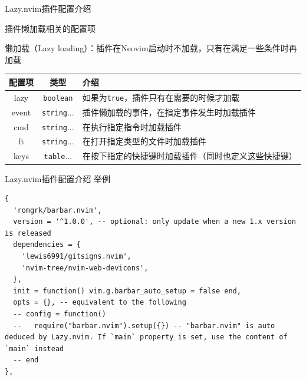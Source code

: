 \documentclass[aspectratio=169]{ctexbeamer}
\begin{document}
  \begin{frame}{Lazy.nvim插件配置介绍}

    插件懒加载相关的配置项

    懒加载（Lazy loading）：插件在Neovim启动时不加载，只有在满足一些条件时再加载

    \begin{table}[H]
      \centering
      \small
      \begin{tabular}{ccp{8cm}}
        \toprule
        配置项   & 类型                                                      & 介绍                         \\
        \midrule
        lazy  & \lstinline{boolean} & 如果为\lstinline{true}，插件只有在需要的时候才加载                              \\
        event & \lstinline{string}...                                   & 插件懒加载的事件，在指定事件发生时加载插件      \\ %
        cmd   & \lstinline{string}...                                   & 在执行指定指令时加载插件               \\ %
        ft    & \lstinline{string}...                                   & 在打开指定类型的文件时加载插件            \\ %
        keys  & \lstinline{table}...                                    & 在按下指定的快捷键时加载插件（同时也定义这些快捷键） \\ %
        \bottomrule
      \end{tabular}
    \end{table}

  \end{frame}

  \begin{frame}[fragile]{Lazy.nvim插件配置介绍}
    举例

    \begin{lstlisting}
{
  'romgrk/barbar.nvim',
  version = '^1.0.0', -- optional: only update when a new 1.x version is released
  dependencies = {
    'lewis6991/gitsigns.nvim',
    'nvim-tree/nvim-web-devicons',
  },
  init = function() vim.g.barbar_auto_setup = false end,
  opts = {}, -- equivalent to the following
  -- config = function()
  --   require("barbar.nvim").setup({}) -- "barbar.nvim" is auto deduced by Lazy.nvim. If `main` property is set, use the content of `main` instead
  -- end
},
    \end{lstlisting}
  \end{frame}
\end{document}
